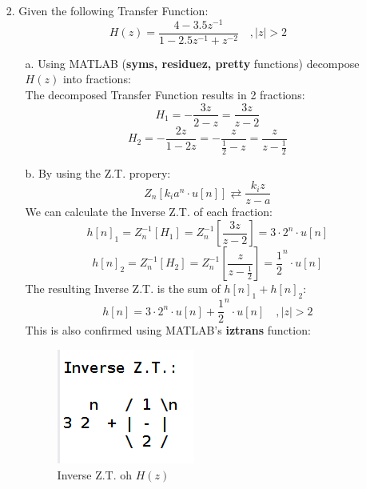 \documentclass[12pt, a4paper]{article}
\begin{document}
\begin{enumerate}
\begin{enumerate}
    \end{enumerate}
    \item[2.] Given the following Transfer Function:
    \[H(z) = \frac{4-3.5z^{-1}}{1-2.5z^{-1}+z^{-2}}\quad ,|z| > 2\]
    \begin{enumerate}
        \item[a.] Using MATLAB (\textbf{syms, residuez, pretty} functions) decompose \(H(z)\) into fractions:\\
        The decomposed Transfer Function results in 2 fractions:
        \[H_1 = -\frac{3z}{2-z} = \boxed{\frac{3z}{z-2}}\]
        \[H_2 = -\frac{2z}{1 - 2z} = -\frac{z}{\frac{1}{2} - z} = \boxed{\frac{z}{z-\frac{1}{2}}}\]
        \item[b.] By using the Z.T. propery:
        \[Z_n[k_i a^n \cdot u[n]] \rightleftarrows \frac{k_i z}{z-a}\]
        We can calculate the Inverse Z.T. of each fraction:
        \[h{[n]}_1 = Z_n^{-1}[H_1] = Z_n^{-1}\left[\frac{3z}{z-2}\right] = \boxed{3\cdot2^n \cdot u[n]}\]
        \[h{[n]}_2 = Z_n^{-1}[H_2] = Z_n^{-1}\left[\frac{z}{z-\frac{1}{2}}\right] = \boxed{\frac{1}{2}^n \cdot u[n]}\]
        \newline
        The resulting Inverse Z.T. is the sum of \(h{[n]}_1 + h{[n]}_2\):
        \[\boxed{h[n] = 3\cdot2^n \cdot u[n] + \frac{1}{2}^n \cdot u[n]\quad ,|z| > 2}\]
        This is also confirmed using MATLAB's \textbf{iztrans} function:
        \begin{figure}[H]
            \centering
            \includegraphics[scale=0.6]{izt.png}
            \caption{Inverse Z.T. oh \(H(z)\)}
        \end{figure}
    \end{enumerate}
\end{enumerate}
\end{document}
